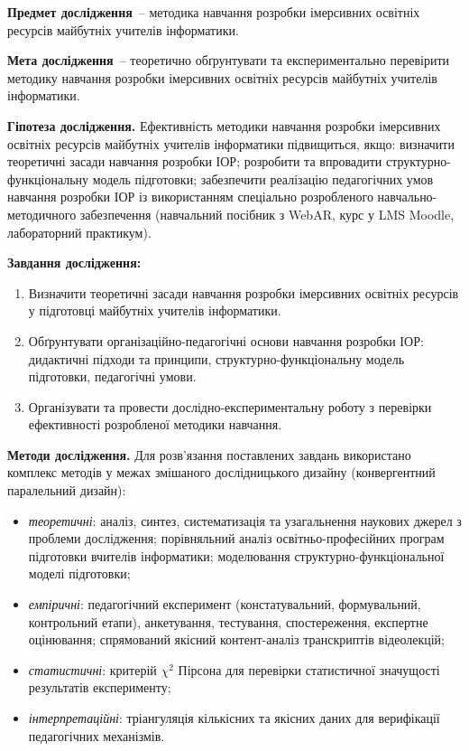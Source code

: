 \textbf{Предмет дослідження}~-- методика навчання розробки імерсивних освітніх ресурсів майбутніх учителів інформатики.

\textbf{Мета дослідження}~-- теоретично обґрунтувати та експериментально перевірити методику навчання розробки імерсивних освітніх ресурсів майбутніх учителів інформатики.

\textbf{Гіпотеза дослідження.} Ефективність методики навчання розробки імерсивних освітніх ресурсів майбутніх учителів інформатики підвищиться, якщо: визначити теоретичні засади навчання розробки ІОР; розробити та впровадити структурно-функціональну модель підготовки; забезпечити реалізацію педагогічних умов навчання розробки ІОР із використанням спеціально розробленого навчально-методичного забезпечення (навчальний посібник з WebAR, курс у LMS Moodle, лабораторний практикум).

\textbf{Завдання дослідження:}
\begin{enumerate}
    \item Визначити теоретичні засади навчання розробки імерсивних освітніх ресурсів у підготовці майбутніх учителів інформатики.
    \item Обґрунтувати організаційно-педагогічні основи навчання розробки ІОР: дидактичні підходи та принципи, структурно-функціональну модель підготовки, педагогічні умови.
    \item Організувати та провести дослідно-експериментальну роботу з перевірки ефективності розробленої методики навчання.
\end{enumerate}

\textbf{Методи дослідження.} Для розв'язання поставлених завдань використано комплекс методів у межах змішаного дослідницького дизайну (конвергентний паралельний дизайн):
\begin{itemize}
    \item \textit{теоретичні}: аналіз, синтез, систематизація та узагальнення наукових джерел з проблеми дослідження; порівняльний аналіз освітньо-професійних програм підготовки вчителів інформатики; моделювання структурно-функціональної моделі підготовки;
    \item \textit{емпіричні}: педагогічний експеримент (констатувальний, формувальний, контрольний етапи), анкетування, тестування, спостереження, експертне оцінювання; спрямований якісний контент-аналіз транскриптів відеолекцій;
    \item \textit{статистичні}: критерій $\chi^2$ Пірсона для перевірки статистичної значущості результатів експерименту;
    \item \textit{інтерпретаційні}: тріангуляція кількісних та якісних даних для верифікації педагогічних механізмів.
\end{itemize}

